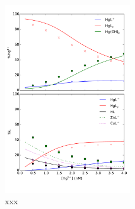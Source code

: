 \documentclass[12pt, a4paper]{article}
\begin{document}
\\
\begin{figure}[h]
\centering
\includegraphics[width=0.5\textwidth]{../pflotran/speciation/Dong2010/ex4/ex4.pdf}
\caption{xxx}
\label{Fig4}
\end{figure}


\clearpage
%
%
%
\end{document}

